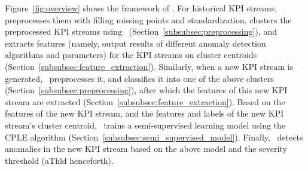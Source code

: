Figure~\ref{fig:overview} shows the framework of \name{}.
For historical KPI streams, \name{} preprocesses them with filling missing points and standardization, clusters the preprocessed KPI streams using \ROCKA~(Section~\ref{subsubsec:preprocessing}), and extracts features (namely, output results of different anomaly detection algorithms and parameters) for the KPI streams on cluster centroids (Section~\ref{subsubsec:feature_extraction}).
Similarly, when a new KPI stream is generated, \name~preprocesses it, and classifies it into one of the above clusters (Section~\ref{subsubsec:preprocessing}), after which the features of this new KPI stream are extracted (Section~\ref{subsubsec:feature_extraction}).
Based on the features of the new KPI stream, and the features and labels of the new KPI stream's cluster centroid, 
\name~trains a semi-supervised learning model using the CPLE algorithm (Section~\ref{subsubsec:semi_supervised_model}).
Finally, \name~detects anomalies in the new KPI stream based on the above model and the severity threshold (aThld henceforth).




